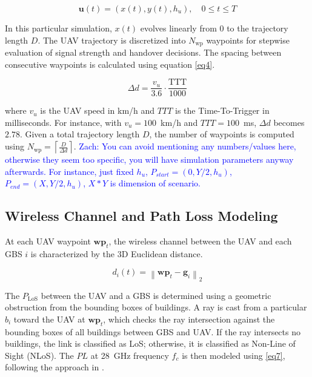 \documentclass[conference]{IEEEtran}
\newcommand*\zc[1]{\textcolor{blue}{Zach: #1}}
\begin{document}
\begin{equation}
\label{eq3} 
\mathbf{u}(t) = (x(t), y(t), h_u), \quad 0 \le t \le T
\end{equation}

In this particular simulation, $x(t)$ evolves linearly from 0 to the trajectory length $D$. The UAV trajectory is discretized into $N_{\text{wp}}$ waypoints for stepwise evaluation of signal strength and handover decisions. The spacing between consecutive waypoints is calculated using equation \eqref{eq4}. 

\begin{equation}
\label{eq4} 
\Delta d = \frac{v_u}{3.6} \cdot \frac{\mathrm{TTT}}{1000}
\end{equation}

where $v_u$ is the UAV speed in km/h and $TTT$ is the Time-To-Trigger in milliseconds. For instance, with $v_u = 100$~km/h and $TTT = 100$~ms, $\Delta d$ becomes $2.78$. Given a total trajectory length $D$, the number of waypoints is computed using $N_{\text{wp}} = \left\lceil \frac{D}{\Delta d} \right\rceil$. \zc{You can avoid mentioning any numbers/values here, otherwise they seem too specific, you will have simulation parameters anyway afterwards. For instance, just fixed $h_u$, $P_{start} = (0, Y/2, h_u)$, $P_{end} = (X, Y/2, h_u)$, $X*Y$ is dimension of scenario.}



\subsection{Wireless Channel and Path Loss Modeling}

At each UAV waypoint \(\mathbf{wp}_t\), the wireless channel between the UAV and each GBS $i$ is characterized by the 3D Euclidean distance.

\begin{equation}
d_i(t) = \left\| \mathbf{wp}_t - \mathbf{g}_i \right\|_2
\end{equation}


The $P_{\mathrm{LoS}}$ between the UAV and a GBS is determined using a geometric obstruction from the bounding boxes of buildings. A ray is cast from a particular $b_i$ toward the UAV at $\mathbf{wp}_t$, which checks the ray intersection against the bounding boxes of all buildings between GBS and UAV. If the ray intersects no buildings, the link is classified as LoS; otherwise, it is classified as Non-Line of Sight (NLoS). The $PL$ at 28~GHz frequency $f_c$ is then modeled using \eqref{eq7}, following the approach in \cite{6834753}.
\end{document}

